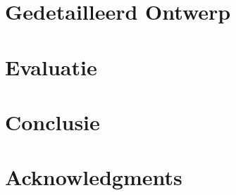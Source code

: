 \documentclass{acm}
\begin{document}
\section{Gedetailleerd Ontwerp}
\label{sec_detail}

\section{Evaluatie}
\label{sec_evaluatie}

\section{Conclusie}
\label{sec_conclusie}

\section{Acknowledgments}
\end{document}
